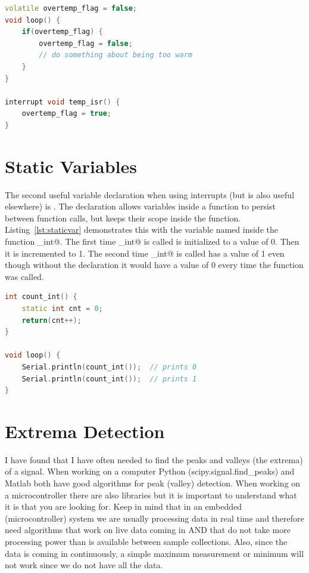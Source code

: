 \begin{lstlisting}[language=C++, caption={This code illustrates using volatile for variables used in ISRs.},label={lst:volatile}]
volatile overtemp_flag = false;
void loop() {
    if(overtemp_flag) {
        overtemp_flag = false;
        // do something about being too warm
    }
}

interrupt void temp_isr() {
    overtemp_flag = true;
}
\end{lstlisting}

\section{Static Variables}
The second useful variable declaration when using interrupts (but is also useful elsewhere) is 
\lstinline@static@. The \lstinline@static@ declaration allows variables inside a function to 
persist between function calls, but keeps their scope inside the function. Listing~\ref{lst:staticvar}
demonstrates this with the variable named \lstinline@cnt@ inside the function \lstinline@count_int@. The
first time \lstinline@count_int@ is called \lstinline@cnt@ is initialized to a value of 0. Then it is 
incremented to 1. The second time \lstinline@count_int@ is called \lstinline@cnt@ has a value of 1 even 
though without the \lstinline@static@ declaration it would have a value of 0 every time the function was 
called. 

\begin{lstlisting}[language=C++, caption={This code demonstrates the functionality of a static variable.},label={lst:staticvar}]
int count_int() {
    static int cnt = 0;
    return(cnt++);
} 

void loop() {
    Serial.println(count_int());  // prints 0
    Serial.println(count_int());  // prints 1
}
\end{lstlisting}

\section{Extrema Detection}
I have found that I have often needed to find the peaks and valleys (the extrema) of a signal.
When working on a computer Python (scipy.signal.find\_peaks) and Matlab both have good algorithms
for peak (valley) detection. When working on a microcontroller there are also libraries
but it is important to understand what it is that you are looking for. Keep in mind that in 
an embedded (microcontroller) system we are usually processing data in real time and therefore 
need algorithms that work on live data coming in AND that do not take more processing power 
than is available between sample collections. Also, since the data is coming in continuously,
a simple maximum measurement or minimum will not work since we do not have all the data.

